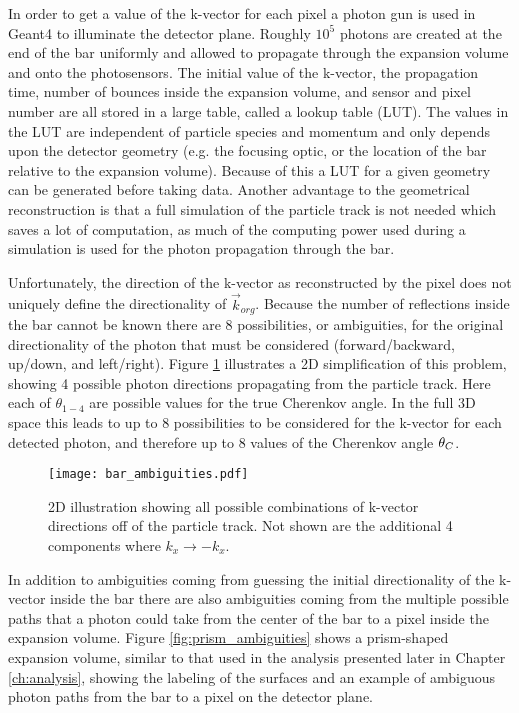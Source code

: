 In order to get a value of the k-vector for each pixel a photon gun is used in Geant4 to illuminate the detector plane. Roughly $10^5$ photons are created at the end of the bar uniformly and allowed to propagate through the expansion volume and onto the photosensors. The initial value of the k-vector, the propagation time,  number of bounces inside the expansion volume, and sensor and pixel number are all stored in a large table, called a lookup table (LUT). The values in the LUT are independent of particle species and momentum and only depends upon the detector geometry (e.g. the focusing optic, or the location of the bar relative to the expansion volume). Because of this a LUT for a given geometry can be generated before taking data. Another advantage to the geometrical reconstruction is that a full simulation of the particle track is not needed which saves a lot of computation, as much of the computing power used during a simulation is used for the photon propagation through the bar.

Unfortunately, the direction of the k-vector as reconstructed by the pixel does not uniquely define the directionality of $\vec{k}_{org}$. Because the number of reflections inside the bar cannot be known there are 8 possibilities, or ambiguities, for the original directionality of the photon that must be considered (forward/backward, up/down, and left/right). Figure \ref{fig:bar_ambiguities} illustrates a 2D simplification of this problem, showing 4 possible photon directions propagating from the particle track. Here each of $\theta_{1-4}$ are possible values for the true Cherenkov angle. In the full 3D space this leads to up to 8 possibilities to be considered for the k-vector for each detected photon, and therefore up to 8 values of the Cherenkov angle $\theta_{C}$.

\begin{figure}[!htb]
	\centering
	\texttt{[image: bar\_ambiguities.pdf]}
	\caption{2D illustration showing all possible combinations of k-vector directions off of the particle track. Not shown are the additional 4 components where $k_x \rightarrow -k_x$.}
	\label{fig:bar_ambiguities}
\end{figure}

In addition to ambiguities coming from guessing the initial directionality of the k-vector inside the bar there are also ambiguities coming from the multiple possible paths that a photon could take from the center of the bar to a pixel inside the expansion volume. Figure \ref{fig:prism_ambiguities} shows a prism-shaped expansion volume, similar to that used in the analysis presented later in Chapter \ref{ch:analysis}, showing the labeling of the surfaces and an example of ambiguous photon paths from the bar to a pixel on the detector plane.

